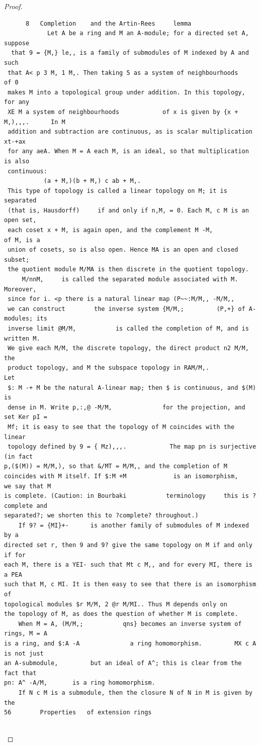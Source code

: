 \begin{proof}
\begin{verbatim}
      8   Completion    and the Artin-Rees     lemma
            Let A be a ring and M an A-module; for a directed set A, suppose
  that 9 = {M,} le,, is a family of submodules of M indexed by A and such
 that A< p 3 M, 1 M,. Then taking 5 as a system of neighbourhoods                of 0
 makes M into a topological group under addition. In this topology, for any
 XE M a system of neighbourhoods            of x is given by {x + M,),,,.      In M
 addition and subtraction are continuous, as is scalar multiplication xt-+ax
 for any aeA. When M = A each M, is an ideal, so that multiplication is also
 continuous:
           (a + M,)(b + M,) c ab + M,.
 This type of topology is called a linear topology on M; it is separated
 (that is, Hausdorff)     if and only if n,M, = 0. Each M, c M is an open set,
 each coset x + M, is again open, and the complement M -M,                of M, is a
 union of cosets, so is also open. Hence MA is an open and closed subset;
 the quotient module M/MA is then discrete in the quotient topology.
     M/nnM,     is called the separated module associated with M. Moreover,
 since for i. <p there is a natural linear map (P~~:M/M,, -M/M,,
 we can construct        the inverse system {M/M,;         (P,+} of A-modules; its
 inverse limit @M/M,           is called the completion of M, and is written M.
 We give each M/M, the discrete topology, the direct product n2 M/M, the
 product topology, and M the subspace topology in RAM/M,.                        Let
 $: M -+ M be the natural A-linear map; then $ is continuous, and $(M) is
 dense in M. Write p,:,@ -M/M,              for the projection, and set Ker pI =
 Mf; it is easy to see that the topology of M coincides with the linear
 topology defined by 9 = { Mz),,,.            The map pn is surjective (in fact
p,($(M)) = M/M,), so that &/MT = M/M,, and the completion of M
coincides with M itself. If $:M +M             is an isomorphism,    we say that M
is complete. (Caution: in Bourbaki           terminology     this is ?complete and
separated?; we shorten this to ?complete? throughout.)
    If 9? = {MI}+-      is another family of submodules of M indexed by a
directed set r, then 9 and 9? give the same topology on M if and only if for
each M, there is a YEI- such that Mt c M,, and for every MI, there is a PEA
such that M, c MI. It is then easy to see that there is an isomorphism of
topological modules $r M/M, 2 @r M/MI.. Thus M depends only on
the topology of M, as does the question of whether M is complete.
    When M = A, (M/M,;           qns} becomes an inverse system of rings, M = A
is a ring, and $:A -A              a ring homomorphism.         MX c A is not just
an A-submodule,         but an ideal of A^; this is clear from the fact that
pn: A^ -A/M,       is a ring homomorphism.
    If N c M is a submodule, then the closure N of N in M is given by the
56        Properties   of extension rings


\end{verbatim}
\end{proof}
